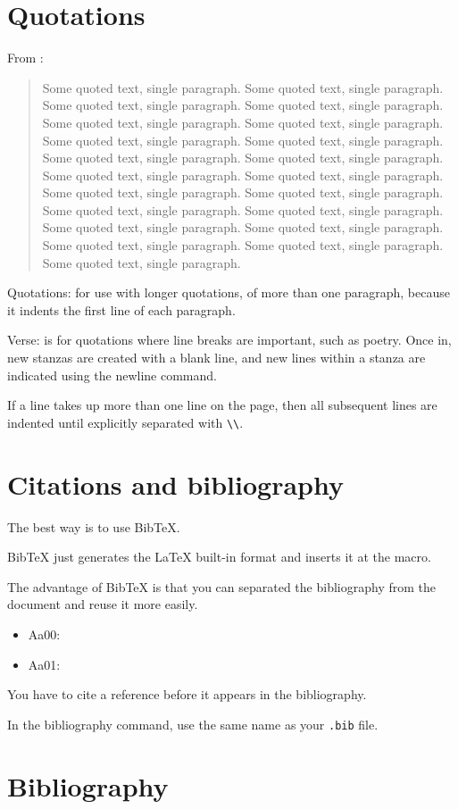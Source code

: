 \documentclass[12pt]{article}
\begin{document}
\section{Quotations}\label{quotations}

  From \cite{Aa00}:

  \begin{quote}
    Some quoted text, single paragraph. Some quoted text, single paragraph. Some quoted text, single paragraph.
    Some quoted text, single paragraph. Some quoted text, single paragraph. Some quoted text, single paragraph.
    Some quoted text, single paragraph. Some quoted text, single paragraph. Some quoted text, single paragraph.
    Some quoted text, single paragraph. Some quoted text, single paragraph. Some quoted text, single paragraph.
    Some quoted text, single paragraph. Some quoted text, single paragraph. Some quoted text, single paragraph.
    Some quoted text, single paragraph. Some quoted text, single paragraph. Some quoted text, single paragraph.
    Some quoted text, single paragraph. Some quoted text, single paragraph. Some quoted text, single paragraph.
  \end{quote}

  Quotations: for use with longer quotations, of more than one paragraph,
  because it indents the first line of each paragraph.

  Verse: is for quotations where line breaks are important, such as poetry.
  Once in, new stanzas are created with a blank line, and new lines within
  a stanza are indicated using the newline command.

  If a line takes up more than one line on the page, then all subsequent lines
  are indented until explicitly separated with \lstinline|\\|.

\section{Citations and bibliography}\label{secCit}

  The best way is to use BibTeX.
  
  BibTeX just generates the LaTeX built-in format and inserts it at the \lstinline|| macro.

  The advantage of BibTeX is that you can separated the bibliography from the document and reuse it more easily.

  \begin{itemize}
    \item Aa00: \cite{Aa00}
    \item Aa01: \cite{Aa01}
  \end{itemize}

  You have to cite a reference before it appears in the bibliography.

  In the bibliography command, use the same name as your \lstinline|.bib| file.

\section{Bibliography}\label{secBib}

  
\end{document}
